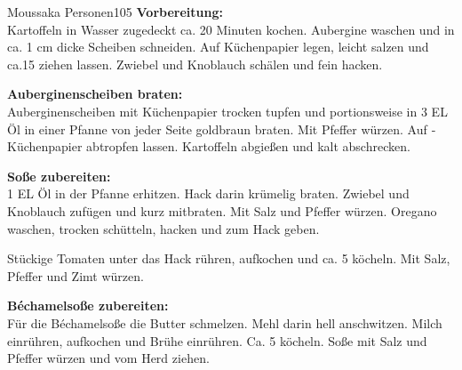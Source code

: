 \begin{MyRecipe}{Moussaka}{ Personen}{\SI{105}{\minuteprime}}
\textbf{Vorbereitung:}\\
Kartoffeln in Wasser zugedeckt ca. 20 Minuten kochen. Aubergine waschen und in ca. 1 cm dicke Scheiben schneiden. Auf ­Küchenpapier legen, leicht salzen und ca.\SI{15}{\minuteprime} ziehen lassen. Zwiebel und Knoblauch schälen und fein hacken.\par\bigskip

\textbf{Auberginenscheiben braten:}\\
Auberginenscheiben mit Küchenpapier trocken tupfen und portionsweise in 3 EL Öl in einer Pfanne von jeder Seite goldbraun braten. Mit Pfeffer würzen. Auf ­Küchenpapier abtropfen lassen. Kartoffeln abgießen und kalt abschrecken.\par\bigskip

\textbf{Soße zubereiten:}\\
1 EL Öl in der Pfanne erhitzen. Hack darin krümelig braten. Zwiebel und Knoblauch zufügen und kurz mitbraten. Mit Salz und Pfeffer würzen. Oregano waschen, trocken schütteln, hacken und zum Hack geben. \par
Stückige Tomaten unter das Hack rühren, aufkochen und ca. \SI{5}{\minuteprime} köcheln. Mit Salz, Pfeffer und Zimt würzen.\par\bigskip


\textbf{Béchamelsoße zubereiten:}\\
Für die Béchamelsoße die Butter schmelzen. Mehl dar­in hell anschwitzen. Milch einrühren, aufkochen und Brühe einrühren. Ca. \SI{5}{\minuteprime} köcheln. Soße mit Salz und Pfeffer würzen und vom Herd ziehen.\par\bigskip



\end{MyRecipe}
